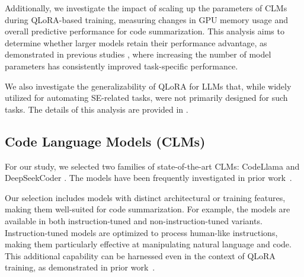 Additionally, we investigate the impact of scaling up the parameters of CLMs during QLoRA-based training, measuring changes in GPU memory usage and overall predictive performance for code summarization. This analysis aims to determine whether larger models retain their performance advantage, as demonstrated in previous studies \cite{sun2024extractive,shi2022evaluation,fang2024esale,gros2020code}, where increasing the number of model parameters has consistently improved task-specific performance.

We also investigate the generalizability of QLoRA for LLMs that, while widely utilized for automating SE-related tasks, were not primarily designed for such tasks. The details of this analysis are provided in .



\subsection{Code Language Models (CLMs)} 
\label{sub:design_llm}

For our study, we selected two families of state-of-the-art CLMs: CodeLlama \cite{codellama2} and DeepSeekCoder \cite{deepseek}. The models have been frequently investigated in prior work~\cite{deepseek,majdoub2024debugging,wang2024systematic}.  

Our selection includes models with distinct architectural or training features, making them well-suited for  code summarization. For example, the models are available in both instruction-tuned and non-instruction-tuned variants. Instruction-tuned models are optimized to process human-like instructions, making them particularly effective at manipulating natural language and code. This additional capability can be harnessed even in the context of QLoRA training, as demonstrated in prior work~\cite{yuan2023evaluating,fan2024exploring}.

